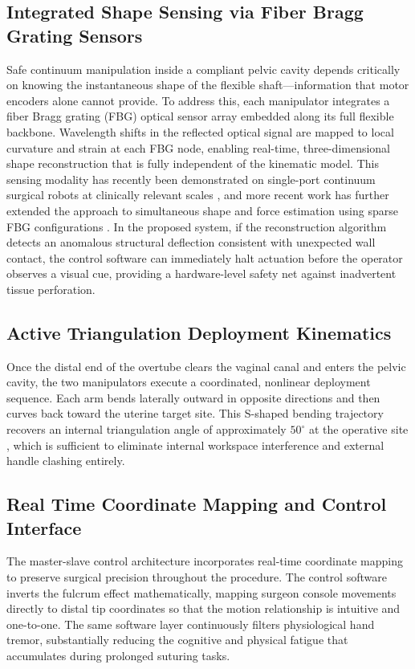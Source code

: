 \documentclass{article}
\begin{document}
\subsection{Integrated Shape Sensing via Fiber Bragg Grating Sensors}
Safe continuum manipulation inside a compliant pelvic cavity depends critically on knowing the instantaneous shape of the flexible shaft---information that motor encoders alone cannot provide. To address this, each manipulator integrates a fiber Bragg grating (FBG) optical sensor array embedded along its full flexible backbone. Wavelength shifts in the reflected optical signal are mapped to local curvature and strain at each FBG node, enabling real-time, three-dimensional shape reconstruction that is fully independent of the kinematic model. This sensing modality has recently been demonstrated on single-port continuum surgical robots at clinically relevant scales \cite{li2023shapesensing}, and more recent work has further extended the approach to simultaneous shape and force estimation using sparse FBG configurations \cite{amirkhani2023fbg}. In the proposed system, if the reconstruction algorithm detects an anomalous structural deflection consistent with unexpected wall contact, the control software can immediately halt actuation before the operator observes a visual cue, providing a hardware-level safety net against inadvertent tissue perforation.

\subsection{Active Triangulation Deployment Kinematics}
Once the distal end of the overtube clears the vaginal canal and enters the pelvic cavity, the two manipulators execute a coordinated, nonlinear deployment sequence. Each arm bends laterally outward in opposite directions and then curves back toward the uterine target site. This S-shaped bending trajectory recovers an internal triangulation angle of approximately $50^{\circ}$ at the operative site \cite{palmer2021robotic}, which is sufficient to eliminate internal workspace interference and external handle clashing entirely.

\subsection{Real Time Coordinate Mapping and Control Interface}
The master-slave control architecture incorporates real-time coordinate mapping to preserve surgical precision throughout the procedure. The control software inverts the fulcrum effect mathematically, mapping surgeon console movements directly to distal tip coordinates so that the motion relationship is intuitive and one-to-one. The same software layer continuously filters physiological hand tremor, substantially reducing the cognitive and physical fatigue that accumulates during prolonged suturing tasks.
\end{document}
